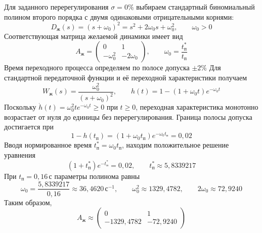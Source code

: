Для заданного перерегулирования $\sigma=0\%$ выбираем стандартный
биномиальный полином второго порядка с двумя одинаковыми
отрицательными корнями:
\begin{equation}
  D_{\text{ж}}(s)=(s+\omega_0)^2
  =s^2+2\omega_0s+\omega_0^2,
  \qquad \omega_0>0
  \label{eq:desired-polynomial}
\end{equation}
Соответствующая матрица желаемой динамики имеет вид
\begin{equation}
  A_{\text{ж}}=
  \begin{pmatrix}0&1\\-\omega_0^2&-2\omega_0\end{pmatrix},
  \qquad
  \omega_0=\frac{t_{\text{п}}^*}{t_{\text{п}}}
  \label{eq:desired-dynamics}
\end{equation}
Время переходного процесса определяем
по полосе допуска $\pm2\%$ Для стандартной передаточной функции
и её переходной характеристики получаем
\begin{equation}
  W_{\text{ж}}(s)=\frac{\omega_0^2}{(s+\omega_0)^2},
  \qquad h(t)=1-(1+\omega_0t)e^{-\omega_0t}
  \label{eq:desired-step}
\end{equation}
Поскольку $\dot h(t)=\omega_0^2t e^{-\omega_0t}\ge0$ при $t\ge0$,
переходная характеристика монотонно возрастает от нуля до единицы
без перерегулирования. Граница полосы допуска достигается при
\begin{equation}
  1-h(t_{\text{п}})
  =(1+\omega_0t_{\text{п}})e^{-\omega_0t_{\text{п}}}=0{,}02
  \label{eq:settling-time}
\end{equation}
Вводя нормированное время $t_{\text{п}}^*=\omega_0t_{\text{п}}$,
находим положительное решение уравнения
\begin{equation}
  (1+t_{\text{п}}^*)e^{-t_{\text{п}}^*}=0{,}02,
  \qquad t_{\text{п}}^*\approx5{,}8339217
  \label{eq:normalized-settling-time}
\end{equation}
При $t_{\text{п}}=0{,}16\,\text{с}$ параметры полинома равны
\begin{equation}
  \omega_0=\frac{5{,}8339217}{0{,}16}
  \approx36{,}4620\,\text{с}^{-1},
  \qquad
  \omega_0^2\approx1329{,}4782,
  \qquad 2\omega_0\approx72{,}9240
  \label{eq:desired-coefficients}
\end{equation}
Таким образом,
\begin{equation}
  A_{\text{ж}}\approx
  \begin{pmatrix}
    0&1\\
    -1329{,}4782&-72{,}9240
  \end{pmatrix}
  \label{eq:desired-dynamics-numeric}
\end{equation}

